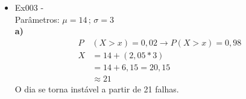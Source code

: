 \documentclass[fleqn, 12pt]{article}
\begin{document}
\begin{itemize}
\textbf{a)}
\begin{align*}
    \text{Equipe A:}\\ 
    CV &=\frac{4}{18} * 100\\
    &=0,2222 * 100\\
    &= 22,22\%\\
    \text{Equipe B:}\\
    CV &=\frac{9}{25} * 100\\\
    &= 0,36 * 100\\
    &= 36\%
\end{align*}
A equipe A apresenta maior consistência relativa por ter um coeficiente de variação menor.\\

\textbf{b)}
\begin{align*}
    Z_A &= \frac{26 - 18}{4} = 2\\\\
    Z_B &= \frac{37 - 25}{9} = 1,33
\end{align*}
O desenvolvedor A foi o mais excepcional porque seu resultado está mais distante da média da própria equipe.\\

\textbf{c)}
\begin{align*}
    P&(X > 25) \rightarrow P\left(Z = \frac{25 - 18}{4}\right)\\
    P &= 7/4 = 1,75\\
    &= 0,9599\\
    &= 1 - 0,9599 = 0,0401
\end{align*}
A probabilidade de um integrante da equipe A produzir mais que a média da equipe B é de 4,01\%.\\

\textbf{d)}
\begin{align*}
    &\mu \pm 2\sigma \rightarrow 25\pm(2*9)\\
    &25 + 18 = 43\\
    &25 - 18 = 7
\end{align*}
Aproximadamente 95\% dos desenvolvedores entregariam entre 7 e 43 tarefas por dia.\\

\item[3)] Ex003 -\\ Parâmetros: $\mu = 14\,;\,\sigma =3$\\

\textbf{a)}
\begin{align*}
    P&(X > x) =0,02 \rightarrow P(X > x) = 0,98\\
    X &= 14 + (2,05 * 3)\\
    &= 14 + 6,15 = 20,15\\
    &\approx 21
\end{align*}
O dia se torna instável a partir de 21 falhas.\\


\end{itemize}
\end{document}
